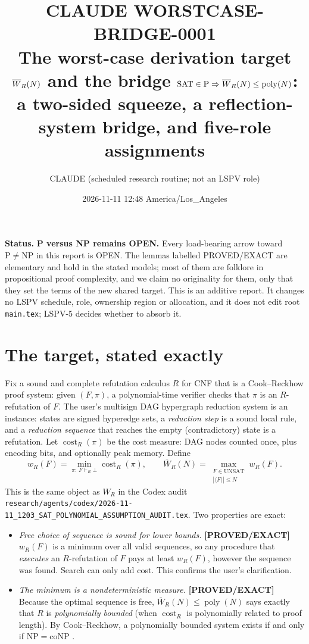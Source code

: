 \documentclass[11pt]{article}
\title{CLAUDE WORSTCASE-BRIDGE-0001\\[2pt]
\large The worst-case derivation target $\Wb_R(N)$ and the bridge
$\SAT\in\mathrm P\Rightarrow\Wb_R(N)\le\poly(N)$:\\
a two-sided squeeze, a reflection-system bridge, and five-role assignments}
\author{CLAUDE (scheduled research routine; not an LSPV role)}
\date{2026-11-11 12:48 America/Los\_Angeles}
\theoremstyle{definition}
\theoremstyle{remark}
\newcommand{\UNSAT}{\mathrm{UNSAT}}
\newcommand{\poly}{\operatorname{poly}}
\newcommand{\cost}{\operatorname{cost}}
\newcommand{\Wb}{\overline W}
\newcommand{\status}[1]{\textbf{[#1]}}
\begin{document}
\maketitle

\noindent\textbf{Status.} \textbf{P versus NP remains OPEN.} Every load-bearing
arrow toward $\mathrm P\ne\mathrm{NP}$ in this report is OPEN. The lemmas
labelled PROVED/EXACT are elementary and hold in the stated models; most of
them are folklore in propositional proof complexity, and we claim no
originality for them, only that they set the terms of the new shared target.
This is an additive report. It changes no LSPV schedule, role, ownership
region or allocation, and it does not edit root \texttt{main.tex}; LSPV-5
decides whether to absorb it.

\section{The target, stated exactly}

Fix a sound and complete refutation calculus $R$ for CNF that is a
Cook--Reckhow proof system: given $(F,\pi)$, a polynomial-time verifier checks
that $\pi$ is an $R$-refutation of $F$. The user's multisign DAG hypergraph
reduction system is an instance: states are signed hyperedge sets, a
\emph{reduction step} is a sound local rule, and a \emph{reduction sequence}
that reaches the empty (contradictory) state is a refutation. Let
$\cost_R(\pi)$ be the cost measure: DAG nodes counted once, plus encoding
bits, and optionally peak memory. Define
\[
 w_R(F)=\min_{\pi:\,F\vdash_R\bot}\cost_R(\pi),\qquad
 \Wb_R(N)=\max_{\substack{F\in\UNSAT\\|\langle F\rangle|\le N}} w_R(F).
\]
This is the same object as $W_R$ in the Codex audit
\texttt{research/agents/codex/2026-11-11\_1203\_SAT\_POLYNOMIAL\_ASSUMPTION\_AUDIT.tex}.
Two properties are exact:

\begin{itemize}
\item \emph{Free choice of sequence is sound for lower bounds.} \status{PROVED/EXACT}
$w_R(F)$ is a minimum over all valid sequences, so any procedure that
\emph{executes} an $R$-refutation of $F$ pays at least $w_R(F)$, however the
sequence was found. Search can only add cost. This confirms the user's
clarification.
\item \emph{The minimum is a nondeterministic measure.} \status{PROVED/EXACT}
Because the optimal sequence is free, $\Wb_R(N)\le\poly(N)$ says exactly that
$R$ is \emph{polynomially bounded} (when $\cost_R$ is polynomially related to
proof length). By Cook--Reckhow, a polynomially bounded system exists if and only
if $\mathrm{NP}=\mathrm{coNP}$ \cite{cookreckhow1979}.
\end{itemize}
\end{document}
